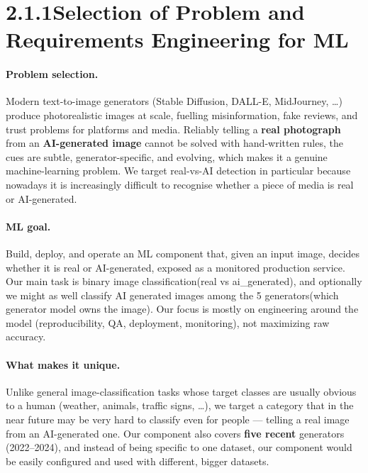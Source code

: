 \documentclass[11pt]{article}
\begin{document}
\section*{2.1.1\quad Selection of Problem and Requirements Engineering for ML}



\paragraph{Problem selection.}
Modern text-to-image generators (Stable Diffusion, DALL-E, MidJourney, \dots) produce photorealistic images at scale, fuelling misinformation, fake reviews, and trust problems for platforms and media. Reliably telling a \textbf{real photograph} from an \textbf{AI-generated image} cannot be solved with hand-written rules, the cues are subtle, generator-specific, and evolving, which makes it a genuine machine-learning problem. We target real-vs-AI detection in particular because nowadays it is increasingly difficult to recognise whether a piece of media is real or AI-generated.

\smallskip
\paragraph{ML goal.} Build, deploy, and operate an ML component that, given an input image, decides whether it is real or AI-generated, exposed as a monitored production service. Our main task is binary image classification(real vs ai\_generated), and optionally we might as well classify AI generated images among the 5 generators(which generator model owns the image).
Our focus is mostly on engineering around the model (reproducibility, QA, deployment, monitoring), not maximizing raw accuracy.

\medskip



\paragraph{What makes it unique.} Unlike general image-classification tasks whose target classes are usually obvious to a human (weather, animals, traffic signs, \dots), we target a category that in the near future may be very hard to classify even for people --- telling a real image from an AI-generated one. Our component also covers \textbf{five recent} generators (2022--2024), and instead of being specific to one dataset, our component would be easily configured and used with different, bigger datasets.
\end{document}
